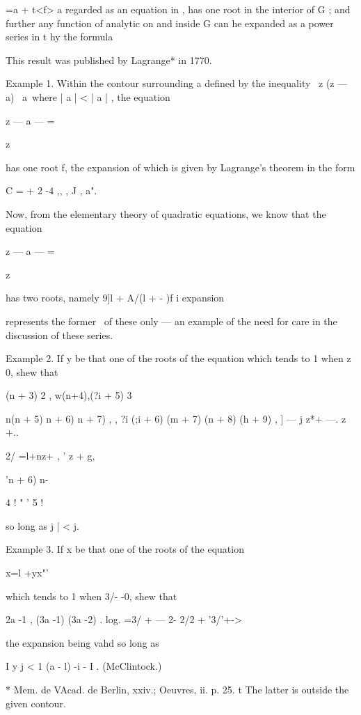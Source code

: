  =a + t<f> a regarded as an equation in , has one root in the interior
of G ; and further any function of analytic on and inside G can he
expanded as a power series in t hy the formula

This result was published by Lagrange* in 1770.

Example 1. Within the contour surrounding a defined by the inequality
\ z (z — a) \ a\, where | a | < | a | , the equation

z — a — =

z

has one root f, the expansion of which is given by Lagrange's theorem
in the form

C = + 2 -4 ,, , J , a".

Now, from the elementary theory of quadratic equations, we know that
the equation

z — a — =

z

has two roots, namely 9]l + A/(l + - )f i %
expansion

represents the former \ of these only — an example of the need for
care in the discussion of these series.

Example 2. If y be that one of the roots of the equation which tends
to 1 when z~ 0, shew that



 (n + 3) 2 , w(n+4),(?i + 5) 3



n(n + 5) n + 6) n + 7) , , ?i (;i + 6) (m + 7) (n + 8) (h + 9) , ] — j
z*+ —. z +..



2/ =l+nz+ , ' z + g,

'n + 6) n-

4 ! " ' 5 !

so long as j | < j.

Example 3. If x be that one of the roots of the equation

x=l +yx"'

which tends to 1 when 3/- -0, shew that

2a -1 , (3a -1) (3a -2) . log. =3/ + — 2- 2/2 + '3/'+->

the expansion being vahd so long as

I y j < 1 (a - l) -i - I . (McClintock.)

* Mem. de VAcad. de Berlin, xxiv.; Oeuvres, ii. p. 25. t The latter is
outside the given contour.



